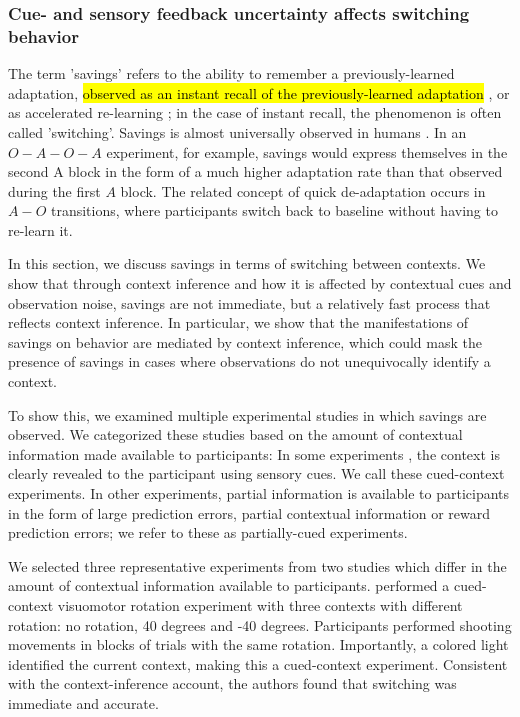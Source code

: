 \documentclass[a4paper,doc,floatsintext,natbib]{apa6}
\DeclareRobustCommand{\newcontent}[1]{\hl{#1}}
\begin{document}
\subsubsection{Cue- and sensory feedback uncertainty affects switching behavior}
The term 'savings' refers to the ability to remember a previously-learned adaptation, \newcontent{observed as an instant recall of the previously-learned adaptation} \cite[e.g.][]{Kim_Neural_2015,Oh_Minimizing_2019}, or as accelerated re-learning \cite[e.g.][]{Kojima_Memory_2004}; in the case of instant recall, the phenomenon is often called 'switching'. Savings is almost universally observed in humans \citep{Brashers-Krug_Consolidation_1996,Shadmehr_Functional_1997,Medina_Mechanism_2001,Smith_Interacting_2006,Zarahn_Explaining_2008}. In an $O-A-O-A$ experiment, for example, savings would express themselves in the second A block in the form of a much higher adaptation rate than that observed during the first $A$ block. The related concept of quick de-adaptation occurs in $A-O$ transitions, where participants switch back to baseline without having to re-learn it.

In this section, we discuss savings in terms of switching between contexts. We show that through context inference and how it is affected by contextual cues and observation noise, savings are not immediate, but a relatively fast process that reflects context inference. In particular, we show that the manifestations of savings on behavior are mediated by context inference, which could mask the presence of savings in cases where observations do not unequivocally identify a context.

To show this, we examined multiple experimental studies in which savings are observed. We categorized these studies based on the amount of contextual information made available to participants: In some experiments \citep[e.g.][]{Kim_Neural_2015,Lee_Dual_2009}, the context is clearly revealed to the participant using sensory cues. We call these cued-context experiments. In other experiments, partial information is available to participants \citep[e.g.][]{Davidson_Scaling_2004,Zarahn_Explaining_2008} in the form of large prediction errors, partial contextual information or reward prediction errors; we refer to these as partially-cued experiments.

We selected three representative experiments from two studies \citep{Kim_Neural_2015,Oh_Minimizing_2019} which differ in the amount of contextual information available to participants. \cite{Kim_Neural_2015} performed a cued-context visuomotor rotation experiment with three contexts with different rotation: no rotation, 40 degrees and -40 degrees. Participants performed shooting movements in blocks of trials with the same rotation. Importantly, a colored light identified the current context, making this a cued-context experiment. Consistent with the context-inference account, the authors found that switching was immediate and accurate.
\end{document}
